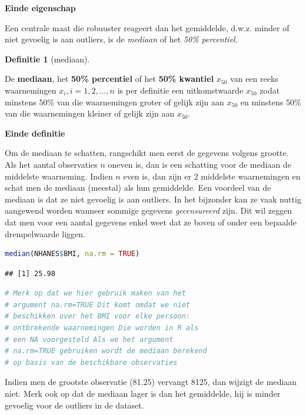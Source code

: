 \documentclass[
  12pt,dutch,coursenotes]{book}
\theoremstyle{definition}
\newtheorem{definition}{Definitie}[chapter]
\theoremstyle{definition}
\theoremstyle{definition}
\theoremstyle{definition}
\theoremstyle{remark}
\begin{document}
\textbf{Einde eigenschap}

Een centrale maat die robuuster reageert dan het gemiddelde, d.w.z. minder
of niet gevoelig is aan outliers, is de \emph{mediaan} of het \emph{50\% percentiel}.

\begin{definition}[mediaan]
\protect\hypertarget{def:unnamed-chunk-95}{}{\label{def:unnamed-chunk-95} {} }
\end{definition}
De \textbf{mediaan}, het \textbf{50\% percentiel} of het \textbf{50\%
kwantiel} \(x_{50}\) van een reeks waarnemingen \(x_i, i=1, 2, \dots, n\) is per
definitie een uitkomstwaarde \(x_{50}\) zodat minstens \(50\%\) van die
waarnemingen groter of gelijk zijn aan \(x_{50}\) en minstens \(50\%\) van die
waarnemingen kleiner of gelijk zijn aan \(x_{50}\).

\textbf{Einde definitie}

Om de mediaan te schatten, rangschikt men eerst de gegevens volgens grootte.
Als het aantal observaties \(n\) oneven is, dan is een schatting voor de
mediaan de middelste waarneming. Indien \(n\) even is, dan zijn er 2 middelste
waarnemingen en schat men de mediaan (meestal) als hun gemiddelde. Een
voordeel van de mediaan is dat ze niet gevoelig is aan outliers. In het bijzonder kan
ze vaak nuttig aangewend worden wanneer sommige gegevens \emph{gecensureerd}
zijn. Dit wil zeggen dat men voor een aantal gegevens enkel weet dat ze
boven of onder een bepaalde drempelwaarde liggen.

\begin{lstlisting}[language=R]
median(NHANES$BMI, na.rm = TRUE)
\end{lstlisting}

\begin{lstlisting}
## [1] 25.98
\end{lstlisting}

\begin{lstlisting}[language=R]
# Merk op dat we hier gebruik maken van het
# argument na.rm=TRUE Dit komt omdat we niet
# beschikken over het BMI voor elke persoon:
# ontbrekende waarnemingen Die worden in R als
# een NA voorgesteld Als we het argument
# na.rm=TRUE gebruiken wordt de mediaan berekend
# op basis van de beschikbare observaties
\end{lstlisting}

Indien men de grootste observatie (81.25) vervangt 8125, dan wijzigt de mediaan niet.
Merk ook op dat de mediaan lager is dan het gemiddelde, hij is minder gevoelig voor de outliers in de dataset.
\end{document}
